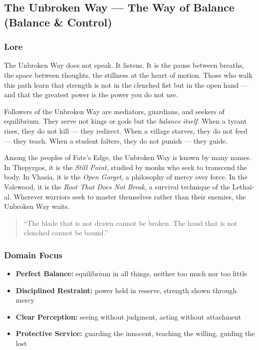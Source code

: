 
\subsection{The Unbroken Way --- The Way of Balance (Balance \& Control)}

\subsubsection*{Lore}
The Unbroken Way does not speak. It listens. It is the pause between breaths, the space between thoughts, the stillness at the heart of motion. Those who walk this path learn that strength is not in the clenched fist but in the open hand --- and that the greatest power is the power you do not use.

Followers of the Unbroken Way are mediators, guardians, and seekers of equilibrium. They serve not kings or gods but the \textit{balance itself}. When a tyrant rises, they do not kill --- they redirect. When a village starves, they do not feed --- they teach. When a student falters, they do not punish --- they guide.

Among the peoples of Fate's Edge, the Unbroken Way is known by many names. In Thepyrgos, it is the \textit{Still Point}, studied by monks who seek to transcend the body. In Vhasia, it is the \textit{Open Gorget}, a philosophy of mercy over force. In the Valewood, it is the \textit{Root That Does Not Break}, a survival technique of the Lethai-al. Wherever warriors seek to master themselves rather than their enemies, the Unbroken Way waits.

\begin{quote}
``The blade that is not drawn cannot be broken. The hand that is not clenched cannot be bound.''
\end{quote}

\subsubsection*{Domain Focus}
\begin{itemize}
  \item \textbf{Perfect Balance:} equilibrium in all things, neither too much nor too little
  \item \textbf{Disciplined Restraint:} power held in reserve, strength shown through mercy
  \item \textbf{Clear Perception:} seeing without judgment, acting without attachment
  \item \textbf{Protective Service:} guarding the innocent, teaching the willing, guiding the lost
\end{itemize}

